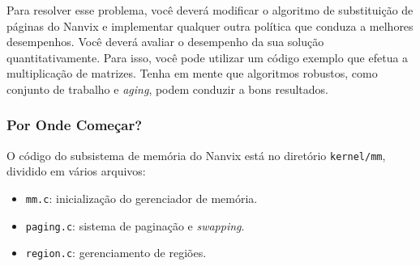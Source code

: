 \documentclass[11pt]{article}
\newif\ifbr
\newif\ifen
\begin{document}
		Para resolver esse problema, você deverá modificar o algoritmo
		de substituição de páginas do Nanvix e implementar qualquer
		outra política que conduza a melhores desempenhos. Você deverá
		avaliar o desempenho da sua solução quantitativamente. Para
		isso, você pode utilizar um código exemplo que efetua a
		multiplicação de matrizes.  Tenha em mente que algoritmos
		robustos, como conjunto de trabalho e \textit{aging}, podem
		conduzir a bons resultados.
\else\ifen
	\subsubsection*{Assignment Description}

		The page replacement component in Nanvix relies on a
		first-in-first-out local page replacement policy. That is,
		whenever a page fault occurs, the operating system chooses,
		among the in-core pages of the faulting process, the oldest page
		to be evicted. This policy has is easy to implement and yields
		to minimum overhead. However, it leads to a poor performance,
		specially those process that present a well-behaved data access
		pattern -- which is usually true.

		For instance, suppose program that performs a matrix multiplication of two
		matrices that do not fit in memory. In this situation, the
		wisest choice is not to keep in memory the most recently used
		pages, but to maintain in-core those that represent the working
		set of the program, which are the pages that store current lines
		and columns that are being multiplied.

		To address this problem, you have to hack the page replacement
		algorithm in Nanvix and implement any other policy that yields
		to a better performance. You have to present a quantitative
		performance analysis of your solution. For doing so, you may use
		the matrix multiplication program that we have provided along
		with the system. Keep in mind that robust algorithms like the
		Working Set and Aging may yield to good results.

\fi\fi

\ifbr
	\subsubsection*{Por Onde Começar?}

		O código do subsistema de memória do Nanvix está no diretório
		\texttt{kernel/mm}, dividido em vários arquivos:
		\begin{itemize}
			\item \texttt{mm.c}: inicialização do gerenciador de memória.
			\item \texttt{paging.c}: sistema de paginação e \textit{swapping}.
			\item \texttt{region.c}: gerenciamento de regiões.
		\end{itemize}
\end{document}
